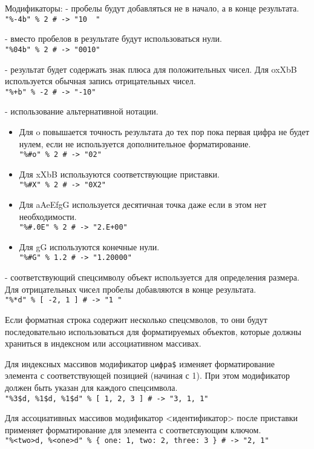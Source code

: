 \begin{keylist}{Модификаторы:}  
  \firstkey{-} - пробелы будут добавляться не в начало, а в конце результата.
  \\\verb!"%-4b" % 2 # -> "10  "!

   - вместо пробелов в результате будут использоваться нули.
  \\\verb!"%04b" % 2 # -> "0010"!
  
   - результат будет содержать знак плюса для положительных чисел. Для oxXbB используется обычная запись отрицательных чисел.
  \\\verb!"%+b" % -2 # -> "-10"!
  
   - использование альтернативной нотации.
  \begin{itemize}
    \item Для o повышается точность результата до тех пор пока первая цифра не будет нулем, если не используется дополнительное форматирование.
    \\\verb!"%#o" % 2 # -> "02"!

    \item Для xXbB используются соответствующие приставки.
    \\\verb!"%#X" % 2 # -> "0X2"!

    \item Для aAeEfgG используется десятичная точка даже если в этом нет необходимости.
    \\\verb!"%#.0E" % 2 # -> "2.E+00"!

    \item Для gG используются конечные нули.
    \\\verb!"%#G" % 1.2 # -> "1.20000"!
  \end{itemize}
  
  \key{*} - соответствующий спецсимволу объект используется для определения размера. Для отрицательных чисел пробелы добавляются в конце результата.
  \\\verb!"%*d" % [ -2, 1 ] # -> "1 "!  
\end{keylist}

Если форматная строка содержит несколько спецсмволов, то они будут последовательно использоваться для форматируемых объектов, которые должны храниться в индексном или ассоциативном массивах.

Для индексных массивов модификатор \verb!цифра$! изменяет форматирование элемента с соответствующей позицией (начиная с 1). При этом модификатор должен быть указан для каждого спецсимвола.
\\\verb!"%3$d, %1$d, %1$d" % [ 1, 2, 3 ] # -> "3, 1, 1"!

Для ассоциативных массивов модификатор <идентификатор> после приставки применяет форматирование для элемента с соответсвующим ключом.
\\\verb!"%<two>d, %<one>d" % { one: 1, two: 2, three: 3 } # -> "2, 1"!